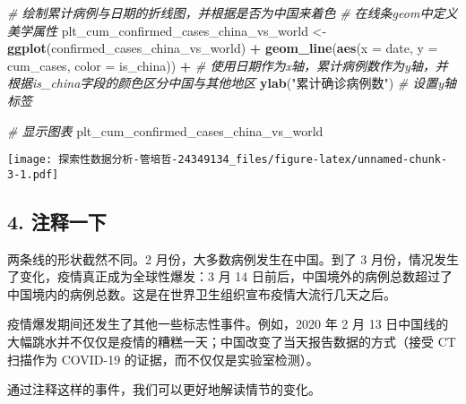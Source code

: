\documentclass[
]{article}
\newenvironment{Shaded}{\begin{snugshade}}{\end{snugshade}}
\newcommand{\AttributeTok}[1]{\textcolor[rgb]{0.13,0.29,0.53}{#1}}
\newcommand{\CommentTok}[1]{\textcolor[rgb]{0.56,0.35,0.01}{\textit{#1}}}
\newcommand{\FunctionTok}[1]{\textcolor[rgb]{0.13,0.29,0.53}{\textbf{#1}}}
\newcommand{\NormalTok}[1]{#1}
\newcommand{\OtherTok}[1]{\textcolor[rgb]{0.56,0.35,0.01}{#1}}
\newcommand{\SpecialCharTok}[1]{\textcolor[rgb]{0.81,0.36,0.00}{\textbf{#1}}}
\newcommand{\StringTok}[1]{\textcolor[rgb]{0.31,0.60,0.02}{#1}}
\begin{document}
\begin{Shaded}
\begin{Highlighting}[]
\CommentTok{\# 绘制累计病例与日期的折线图，并根据是否为中国来着色}
\CommentTok{\# 在线条geom中定义美学属性}
\NormalTok{plt\_cum\_confirmed\_cases\_china\_vs\_world }\OtherTok{\textless{}{-}} \FunctionTok{ggplot}\NormalTok{(confirmed\_cases\_china\_vs\_world) }\SpecialCharTok{+}
  \FunctionTok{geom\_line}\NormalTok{(}\FunctionTok{aes}\NormalTok{(}\AttributeTok{x =}\NormalTok{ date, }\AttributeTok{y =}\NormalTok{ cum\_cases, }\AttributeTok{color =}\NormalTok{ is\_china)) }\SpecialCharTok{+}  \CommentTok{\# 使用日期作为x轴，累计病例数作为y轴，并根据is\_china字段的颜色区分中国与其他地区}
  \FunctionTok{ylab}\NormalTok{(}\StringTok{"累计确诊病例数"}\NormalTok{)  }\CommentTok{\# 设置y轴标签}

\CommentTok{\# 显示图表}
\NormalTok{plt\_cum\_confirmed\_cases\_china\_vs\_world}
\end{Highlighting}
\end{Shaded}

\texttt{[image: 探索性数据分析-管培哲-24349134\_files/figure-latex/unnamed-chunk-3-1.pdf]}

\subsection{4. 注释一下}\label{ux6ce8ux91caux4e00ux4e0b}

两条线的形状截然不同。2 月份，大多数病例发生在中国。到了 3
月份，情况发生了变化，疫情真正成为全球性爆发：3 月 14
日前后，中国境外的病例总数超过了中国境内的病例总数。这是在世界卫生组织宣布疫情大流行几天之后。

疫情爆发期间还发生了其他一些标志性事件。例如，2020 年 2 月 13
日中国线的大幅跳水并不仅仅是疫情的糟糕一天；中国改变了当天报告数据的方式（接受
CT 扫描作为 COVID-19 的证据，而不仅仅是实验室检测）。

通过注释这样的事件，我们可以更好地解读情节的变化。
\end{document}
